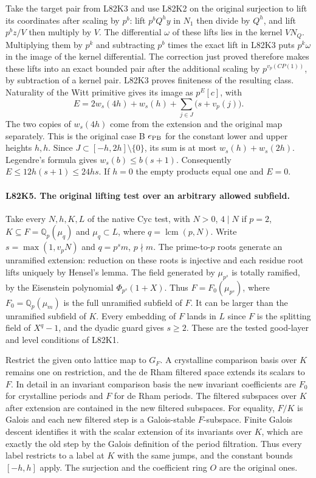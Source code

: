 Take the target pair from L82K3 and use L82K2 on the original
surjection to lift its coordinates after scaling by $p^b$:
lift $p^bQ^hy$ in $N_1$ then divide by $Q^h$, and lift
$p^bz/V$ then multiply by $V$. The differential $\omega$ of
these lifts lies in the kernel $VN_Q$. Multiplying them by
$p^k$ and subtracting $p^b$ times the exact lift in L82K3
puts $p^k\omega$ in the image of the kernel differential.
The correction just proved therefore makes these lifts into an
exact bounded pair after the additional scaling by
$p^{v_p(CP(1))}$, by subtraction of a kernel pair. L82K3
proves finiteness of the resulting class. Naturality of the Witt
primitive gives its image as $p^E[c]$, with
\[
 E=2w_s(4h)+w_s(h)+\sum_{j\in J}\bigl(s+v_p(j)\bigr).
\]
The two copies of $w_s(4h)$ come from the extension and
the original map separately. This is the original case B
$e_{\rm PB}$ for the constant lower and upper heights $h,h$.
Since $J\subset[-h,2h]\setminus\{0\}$, its sum is at most
$w_s(h)+w_s(2h)$. Legendre's formula gives
$w_s(b)\le b(s+1)$. Consequently $E\le12h(s+1)\le24hs$.
If $h=0$ the empty products equal one and $E=0$.

\paragraph{L82K5. The original lifting test over an arbitrary allowed subfield.}
Take every $N,h,K,L$ of the native $\mathrm{Cyc}$ test, with
$N>0$, $4\mid N$ if $p=2$, $K\subseteq F=\mathbb Q_p(\mu_q)$
and $\mu_q\subset L$, where $q=\operatorname{lcm}(p,N)$.
Write $s=\max(1,v_pN)$ and $q=p^s m$, $p\nmid m$.
The prime-to-$p$ roots generate an unramified extension: reduction
on these roots is injective and each residue root lifts uniquely
by Hensel's lemma. The field generated by $\mu_{p^s}$ is totally
ramified, by the Eisenstein polynomial $\Phi_{p^s}(1+X)$.
Thus $F=F_0(\mu_{p^s})$, where $F_0=\mathbb Q_p(\mu_m)$
is the full unramified subfield of $F$. It can be larger than
the unramified subfield of $K$. Every embedding of $F$ lands in
$L$ since $F$ is the splitting field of $X^q-1$, and the
dyadic guard gives $s\ge2$. These are the tested good-layer
and level conditions of L82K1.

Restrict the given onto lattice map to $G_F$. A crystalline
comparison basis over $K$ remains one on restriction, and the
de Rham filtered space extends its scalars to $F$. In detail in
an invariant comparison basis the new invariant coefficients are
$F_0$ for crystalline periods and $F$ for de Rham periods.
The filtered subspaces over $K$ after extension are contained
in the new filtered subspaces. For equality, $F/K$ is Galois and each new filtered
step is a Galois-stable $F$-subspace. Finite Galois descent
identifies it with the scalar extension of its invariants over
$K$, which are exactly the old step by the Galois definition of
the period filtration. Thus every label restricts to a label at $K$ with the same
jumps, and the constant bounds $[-h,h]$ apply. The surjection
and the coefficient ring $O$ are the original ones.

